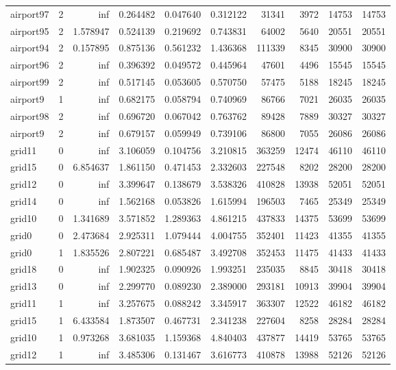 \begin{longtable}{|l|r|r|r|r|r|r|r|r|r|}
airport97 & 2 & inf & 0.264482 & 0.047640 & 0.312122 & 31341 & 3972 & 14753 & 14753 \\
airport95 & 2 & 1.578947 & 0.524139 & 0.219692 & 0.743831 & 64002 & 5640 & 20551 & 20551 \\
airport94 & 2 & 0.157895 & 0.875136 & 0.561232 & 1.436368 & 111339 & 8345 & 30900 & 30900 \\
airport96 & 2 & inf & 0.396392 & 0.049572 & 0.445964 & 47601 & 4496 & 15545 & 15545 \\
airport99 & 2 & inf & 0.517145 & 0.053605 & 0.570750 & 57475 & 5188 & 18245 & 18245 \\
airport9 & 1 & inf & 0.682175 & 0.058794 & 0.740969 & 86766 & 7021 & 26035 & 26035 \\
airport98 & 2 & inf & 0.696720 & 0.067042 & 0.763762 & 89428 & 7889 & 30327 & 30327 \\
airport9 & 2 & inf & 0.679157 & 0.059949 & 0.739106 & 86800 & 7055 & 26086 & 26086 \\
grid11 & 0 & inf & 3.106059 & 0.104756 & 3.210815 & 363259 & 12474 & 46110 & 46110 \\
grid15 & 0 & 6.854637 & 1.861150 & 0.471453 & 2.332603 & 227548 & 8202 & 28200 & 28200 \\
grid12 & 0 & inf & 3.399647 & 0.138679 & 3.538326 & 410828 & 13938 & 52051 & 52051 \\
grid14 & 0 & inf & 1.562168 & 0.053826 & 1.615994 & 196503 & 7465 & 25349 & 25349 \\
grid10 & 0 & 1.341689 & 3.571852 & 1.289363 & 4.861215 & 437833 & 14375 & 53699 & 53699 \\
grid0 & 0 & 2.473684 & 2.925311 & 1.079444 & 4.004755 & 352401 & 11423 & 41355 & 41355 \\
grid0 & 1 & 1.835526 & 2.807221 & 0.685487 & 3.492708 & 352453 & 11475 & 41433 & 41433 \\
grid18 & 0 & inf & 1.902325 & 0.090926 & 1.993251 & 235035 & 8845 & 30418 & 30418 \\
grid13 & 0 & inf & 2.299770 & 0.089230 & 2.389000 & 293181 & 10913 & 39904 & 39904 \\
grid11 & 1 & inf & 3.257675 & 0.088242 & 3.345917 & 363307 & 12522 & 46182 & 46182 \\
grid15 & 1 & 6.433584 & 1.873507 & 0.467731 & 2.341238 & 227604 & 8258 & 28284 & 28284 \\
grid10 & 1 & 0.973268 & 3.681035 & 1.159368 & 4.840403 & 437877 & 14419 & 53765 & 53765 \\
grid12 & 1 & inf & 3.485306 & 0.131467 & 3.616773 & 410878 & 13988 & 52126 & 52126 \\

\end{longtable}
